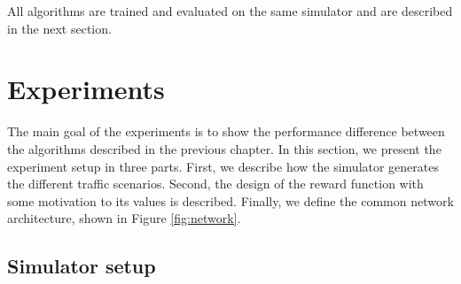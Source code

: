 All algorithms are trained and evaluated on the same simulator and are described in the next section. 

%         

\section{Experiments}
\label{sec:experiments}
The main goal of the experiments is to show the performance difference between the algorithms described in the previous chapter. 
In this section, we present the experiment setup in three parts. First, we describe how the simulator generates the different traffic scenarios. Second, the design of the reward function with some motivation to its values is described. Finally, we define the common network architecture, shown in Figure \ref{fig:network}.


\subsection{Simulator setup}
\label{sec:simulation_setup}



